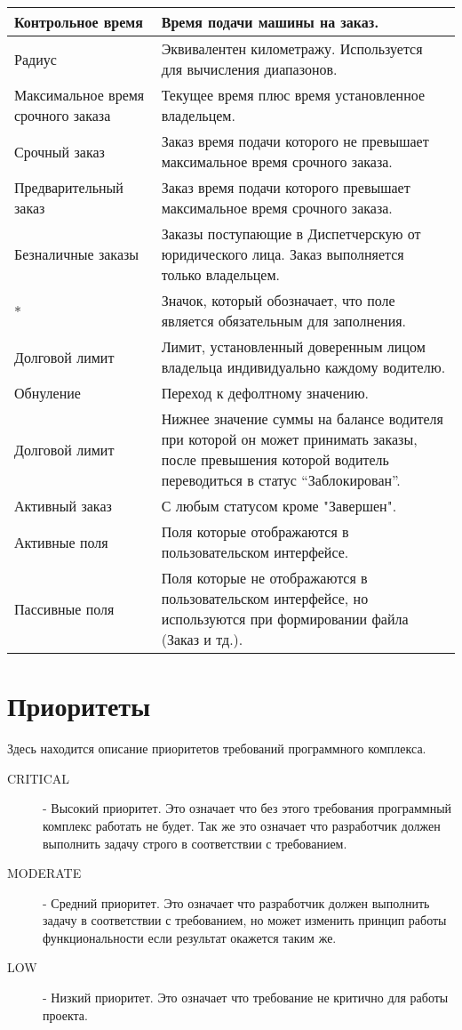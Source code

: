 \begin{longtable}{|p{4cm}|p{9cm}|}
			    \hline  Контрольное время &  Время подачи машины на заказ.\\ [2mm]
				\hline  Радиус&  Эквивалентен километражу. Используется для вычисления диапазонов.\\ [2mm]
			    \hline  Максимальное время срочного заказа&  Текущее время плюс время установленное владельцем. \\ [2mm]
			    \hline	Срочный заказ &	Заказ время подачи которого не превышает максимальное время срочного заказа.\\ [2mm]
			    \hline	Предварительный заказ&	Заказ время подачи которого превышает максимальное время срочного заказа.\\ [2mm]
			    \hline	Безналичные заказы&	Заказы поступающие в Диспетчерскую от юридического лица. Заказ выполняется только владельцем. \\ [2mm]
			    \hline	* &	Значок, который обозначает, что поле является обязательным для заполнения.\\ [2mm]
			    \hline	Долговой лимит&	Лимит, установленный доверенным лицом владельца индивидуально каждому водителю.\\ [2mm]
			    \hline	Обнуление &	Переход к дефолтному значению. \\ [2mm]
			    \hline Долговой лимит & Нижнее значение суммы на балансе водителя при которой он может принимать заказы, после превышения которой водитель переводиться в статус “Заблокирован”. \\ [2mm]
			    \hline Активный заказ & С любым статусом кроме "Завершен". \\ [2mm]

			    \hline Активные поля & Поля которые отображаются в пользовательском интерфейсе. \\ [2mm]
				\hline Пассивные поля & Поля которые не отображаются в пользовательском интерфейсе, но используются при формировании файла (Заказ и тд.). \\ [2mm]

				\hline 
			\end{longtable} 

			\section{Приоритеты}

				Здесь находится описание приоритетов требований программного комплекса.

				\begin{description}
					\item[CRITICAL] - Высокий приоритет. Это означает что без этого требования программный комплекс работать не будет. Так же это означает что разработчик должен выполнить задачу строго в соответствии с требованием.
					\item[MODERATE] - Средний приоритет. Это означает что разработчик должен выполнить задачу в соответствии с требованием, но может изменить принцип работы функциональности если результат окажется таким же. 
					\item[LOW] - Низкий приоритет. Это означает что требование не критично для работы проекта.
				\end{description}

